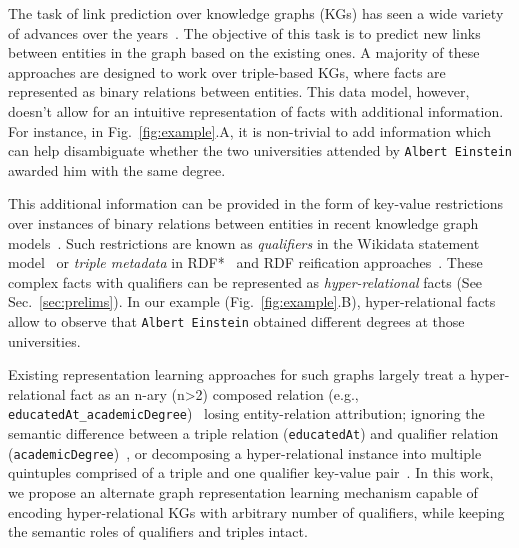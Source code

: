 \documentclass[11pt,a4paper]{article}
\begin{document}
The task of link prediction over knowledge graphs (KGs) has seen a wide variety of advances over the years~\citep{DBLP:journals/corr/abs-2002-00388}. 
The objective of this task is to predict new links between entities in the graph based on the existing ones. A majority of these approaches are designed to work over triple-based KGs, where facts are represented as binary relations between entities.
This data model, however, doesn't allow for an intuitive representation of facts with additional information.
For instance, in Fig.~\ref{fig:example}.A, it is non-trivial to add information which can help disambiguate whether the two universities attended by \texttt{Albert Einstein} awarded him with the same degree.


This additional information can be provided in the form of key-value
restrictions over instances of binary relations between entities in recent knowledge graph models~\citep{DBLP:journals/cacm/VrandecicK14,pellissieryago,DBLP:journals/semweb/IsmayilovKALH18}. 
Such restrictions are known as \emph{qualifiers} in the Wikidata statement model~\citep{DBLP:journals/cacm/VrandecicK14} or \emph{triple metadata} in RDF*~\citep{DBLP:conf/amw/Hartig17} and RDF reification approaches~\citep{DBLP:journals/semweb/FreyMHRV19}.
These complex facts with qualifiers can be represented as \emph{hyper-relational} facts (See Sec.~\ref{sec:prelims}).
In our example (Fig.~\ref{fig:example}.B), hyper-relational facts allow to observe that \texttt{Albert Einstein} obtained different degrees at those universities.


Existing representation learning approaches for such graphs largely treat a hyper-relational fact as an n-ary (n\textgreater2) composed relation (e.g., \texttt{educatedAt\_academicDegree})~\citep{DBLP:conf/www/ZhangLMM18, 10.1145/3366423.3380188} losing entity-relation attribution; ignoring the semantic difference between a triple relation (\texttt{educatedAt}) and qualifier relation (\texttt{academicDegree})~\citep{DBLP:conf/www/GuanJWC19}, or decomposing a hyper-relational instance into multiple quintuples comprised of a triple and one qualifier key-value pair~\citep{10.1145/3366423.3380257}. 
In this work, we propose an alternate graph representation learning mechanism capable of encoding hyper-relational KGs with arbitrary number of qualifiers, while keeping the semantic roles of qualifiers and triples intact.
\end{document}
